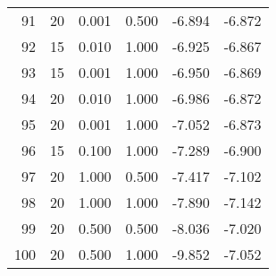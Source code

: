 \begin{tabular}{rrrrrr}
    91 &        20 &  0.001 & 0.500 &                 -6.894 &      -6.872 \\
    92 &        15 &  0.010 & 1.000 &                 -6.925 &      -6.867 \\
    93 &        15 &  0.001 & 1.000 &                 -6.950 &      -6.869 \\
    94 &        20 &  0.010 & 1.000 &                 -6.986 &      -6.872 \\
    95 &        20 &  0.001 & 1.000 &                 -7.052 &      -6.873 \\
    96 &        15 &  0.100 & 1.000 &                 -7.289 &      -6.900 \\
    97 &        20 &  1.000 & 0.500 &                 -7.417 &      -7.102 \\
    98 &        20 &  1.000 & 1.000 &                 -7.890 &      -7.142 \\
    99 &        20 &  0.500 & 0.500 &                 -8.036 &      -7.020 \\
   100 &        20 &  0.500 & 1.000 &                 -9.852 &      -7.052 \\
\bottomrule
\end{tabular}
